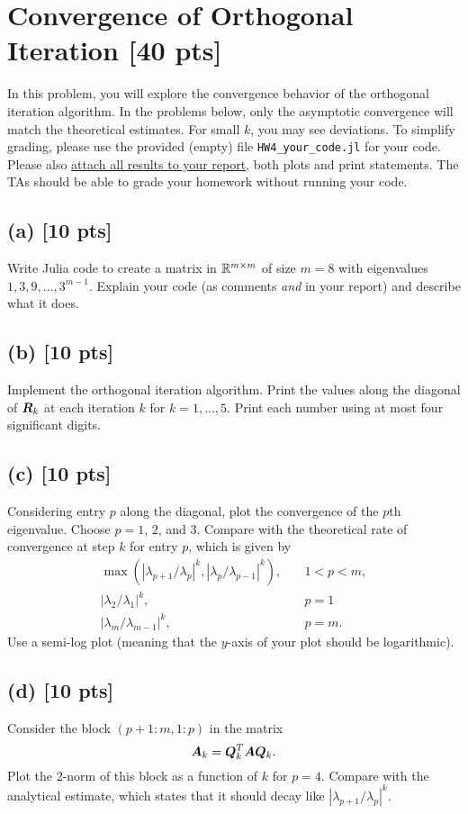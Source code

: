 \documentclass[twoside,10pt]{article}
\begin{document}
\section{Convergence of Orthogonal Iteration [40 pts]}
  In this problem, you will explore the convergence behavior of the orthogonal iteration algorithm. In the problems below, only the asymptotic convergence will match the theoretical estimates. 
  For small $k$, you may see deviations. 
  To simplify grading, please use the provided (empty) file \texttt{HW4\_your\_code.jl} for your code. 
  Please also \underline{attach all results to your report}, both plots and print statements. 
  The TAs should be able to grade your homework without running your code. 
  \subsection*{(a) [10 pts]} 
    Write Julia code to create a matrix in $\mathbb{R}^{m \times m}$ of size $m = 8$ with eigenvalues $1, 3, 9, \ldots, 3^{m -1}$. 
    Explain your code (as comments \emph{and} in your report) and describe what it does.

  \subsection*{(b) [10 pts]}
    Implement the orthogonal iteration algorithm. Print the values along the diagonal of $\bm{R}_{k}$ at each iteration $k$ for $k = 1, \ldots,5$. Print each number using at most four significant digits. 
  
  \subsection*{(c) [10 pts]}
    Considering entry $p$ along the diagonal, plot the convergence of the $p$th eigenvalue. 
    Choose $p = 1$, $2$, and $3$.  
    Compare with the theoretical rate of convergence at step $k$ for entry $p$, which is given by 
    \begin{align}
      \max(|\lambda_{p + 1} / \lambda_p|^k, |\lambda_p / \lambda_{p -1}|^k), \quad &1 < p < m,\\
      |\lambda_2 / \lambda_1|^k, \quad &p = 1\\
      |\lambda_{m} / \lambda_{m -1}|^k, \quad &p = m.
    \end{align}
    Use a semi-log plot (meaning that the $y$-axis of your plot should be logarithmic). 
  
  \subsection*{(d) [10 pts]}
    Consider the block $(p + 1 : m, 1 : p)$ in the matrix 
    \begin{equation}
      \bm{A}_k = \bm{Q}^T_{k} \bm{A} \bm{Q}_{k}.
    \end{equation}
    Plot the 2-norm of this block as a function of $k$ for $p = 4$. Compare with the analytical estimate, which states that it should decay like $|\lambda_{p + 1} / \lambda_p|^k$.
\end{document}
